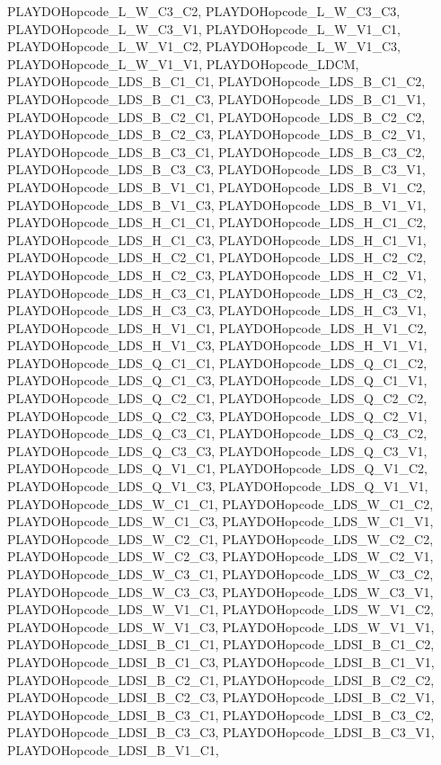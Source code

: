 PLAYDOHopcode\_\-L\_\-W\_\-C3\_\-C2, PLAYDOHopcode\_\-L\_\-W\_\-C3\_\-C3, PLAYDOHopcode\_\-L\_\-W\_\-C3\_\-V1, PLAYDOHopcode\_\-L\_\-W\_\-V1\_\-C1, PLAYDOHopcode\_\-L\_\-W\_\-V1\_\-C2, PLAYDOHopcode\_\-L\_\-W\_\-V1\_\-C3, PLAYDOHopcode\_\-L\_\-W\_\-V1\_\-V1, PLAYDOHopcode\_\-LDCM, PLAYDOHopcode\_\-LDS\_\-B\_\-C1\_\-C1, PLAYDOHopcode\_\-LDS\_\-B\_\-C1\_\-C2, PLAYDOHopcode\_\-LDS\_\-B\_\-C1\_\-C3, PLAYDOHopcode\_\-LDS\_\-B\_\-C1\_\-V1, PLAYDOHopcode\_\-LDS\_\-B\_\-C2\_\-C1, PLAYDOHopcode\_\-LDS\_\-B\_\-C2\_\-C2, PLAYDOHopcode\_\-LDS\_\-B\_\-C2\_\-C3, PLAYDOHopcode\_\-LDS\_\-B\_\-C2\_\-V1, PLAYDOHopcode\_\-LDS\_\-B\_\-C3\_\-C1, PLAYDOHopcode\_\-LDS\_\-B\_\-C3\_\-C2, PLAYDOHopcode\_\-LDS\_\-B\_\-C3\_\-C3, PLAYDOHopcode\_\-LDS\_\-B\_\-C3\_\-V1, PLAYDOHopcode\_\-LDS\_\-B\_\-V1\_\-C1, PLAYDOHopcode\_\-LDS\_\-B\_\-V1\_\-C2, PLAYDOHopcode\_\-LDS\_\-B\_\-V1\_\-C3, PLAYDOHopcode\_\-LDS\_\-B\_\-V1\_\-V1, PLAYDOHopcode\_\-LDS\_\-H\_\-C1\_\-C1, PLAYDOHopcode\_\-LDS\_\-H\_\-C1\_\-C2, PLAYDOHopcode\_\-LDS\_\-H\_\-C1\_\-C3, PLAYDOHopcode\_\-LDS\_\-H\_\-C1\_\-V1, PLAYDOHopcode\_\-LDS\_\-H\_\-C2\_\-C1, PLAYDOHopcode\_\-LDS\_\-H\_\-C2\_\-C2, PLAYDOHopcode\_\-LDS\_\-H\_\-C2\_\-C3, PLAYDOHopcode\_\-LDS\_\-H\_\-C2\_\-V1, PLAYDOHopcode\_\-LDS\_\-H\_\-C3\_\-C1, PLAYDOHopcode\_\-LDS\_\-H\_\-C3\_\-C2, PLAYDOHopcode\_\-LDS\_\-H\_\-C3\_\-C3, PLAYDOHopcode\_\-LDS\_\-H\_\-C3\_\-V1, PLAYDOHopcode\_\-LDS\_\-H\_\-V1\_\-C1, PLAYDOHopcode\_\-LDS\_\-H\_\-V1\_\-C2, PLAYDOHopcode\_\-LDS\_\-H\_\-V1\_\-C3, PLAYDOHopcode\_\-LDS\_\-H\_\-V1\_\-V1, PLAYDOHopcode\_\-LDS\_\-Q\_\-C1\_\-C1, PLAYDOHopcode\_\-LDS\_\-Q\_\-C1\_\-C2, PLAYDOHopcode\_\-LDS\_\-Q\_\-C1\_\-C3, PLAYDOHopcode\_\-LDS\_\-Q\_\-C1\_\-V1, PLAYDOHopcode\_\-LDS\_\-Q\_\-C2\_\-C1, PLAYDOHopcode\_\-LDS\_\-Q\_\-C2\_\-C2, PLAYDOHopcode\_\-LDS\_\-Q\_\-C2\_\-C3, PLAYDOHopcode\_\-LDS\_\-Q\_\-C2\_\-V1, PLAYDOHopcode\_\-LDS\_\-Q\_\-C3\_\-C1, PLAYDOHopcode\_\-LDS\_\-Q\_\-C3\_\-C2, PLAYDOHopcode\_\-LDS\_\-Q\_\-C3\_\-C3, PLAYDOHopcode\_\-LDS\_\-Q\_\-C3\_\-V1, PLAYDOHopcode\_\-LDS\_\-Q\_\-V1\_\-C1, PLAYDOHopcode\_\-LDS\_\-Q\_\-V1\_\-C2, PLAYDOHopcode\_\-LDS\_\-Q\_\-V1\_\-C3, PLAYDOHopcode\_\-LDS\_\-Q\_\-V1\_\-V1, PLAYDOHopcode\_\-LDS\_\-W\_\-C1\_\-C1, PLAYDOHopcode\_\-LDS\_\-W\_\-C1\_\-C2, PLAYDOHopcode\_\-LDS\_\-W\_\-C1\_\-C3, PLAYDOHopcode\_\-LDS\_\-W\_\-C1\_\-V1, PLAYDOHopcode\_\-LDS\_\-W\_\-C2\_\-C1, PLAYDOHopcode\_\-LDS\_\-W\_\-C2\_\-C2, PLAYDOHopcode\_\-LDS\_\-W\_\-C2\_\-C3, PLAYDOHopcode\_\-LDS\_\-W\_\-C2\_\-V1, PLAYDOHopcode\_\-LDS\_\-W\_\-C3\_\-C1, PLAYDOHopcode\_\-LDS\_\-W\_\-C3\_\-C2, PLAYDOHopcode\_\-LDS\_\-W\_\-C3\_\-C3, PLAYDOHopcode\_\-LDS\_\-W\_\-C3\_\-V1, PLAYDOHopcode\_\-LDS\_\-W\_\-V1\_\-C1, PLAYDOHopcode\_\-LDS\_\-W\_\-V1\_\-C2, PLAYDOHopcode\_\-LDS\_\-W\_\-V1\_\-C3, PLAYDOHopcode\_\-LDS\_\-W\_\-V1\_\-V1, PLAYDOHopcode\_\-LDSI\_\-B\_\-C1\_\-C1, PLAYDOHopcode\_\-LDSI\_\-B\_\-C1\_\-C2, PLAYDOHopcode\_\-LDSI\_\-B\_\-C1\_\-C3, PLAYDOHopcode\_\-LDSI\_\-B\_\-C1\_\-V1, PLAYDOHopcode\_\-LDSI\_\-B\_\-C2\_\-C1, PLAYDOHopcode\_\-LDSI\_\-B\_\-C2\_\-C2, PLAYDOHopcode\_\-LDSI\_\-B\_\-C2\_\-C3, PLAYDOHopcode\_\-LDSI\_\-B\_\-C2\_\-V1, PLAYDOHopcode\_\-LDSI\_\-B\_\-C3\_\-C1, PLAYDOHopcode\_\-LDSI\_\-B\_\-C3\_\-C2, PLAYDOHopcode\_\-LDSI\_\-B\_\-C3\_\-C3, PLAYDOHopcode\_\-LDSI\_\-B\_\-C3\_\-V1, PLAYDOHopcode\_\-LDSI\_\-B\_\-V1\_\-C1, 